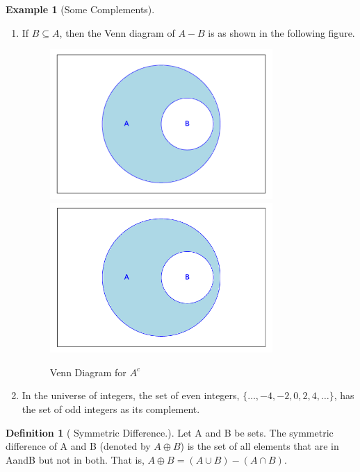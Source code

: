 \documentclass[10pt,]{book}
\theoremstyle{plain}
\theoremstyle{definition}
\newtheorem{definition}[theorem]{Definition}
\newtheorem{example}[theorem]{Example}
\begin{document}
\begin{example}[Some Complements]
\begin{enumerate}
\item\hypertarget{li-60}{} If \(B\subseteq A\), then the Venn diagram of \(A- B\) is as shown in the following figure.   
            \leavevmode%
\begin{figure}
\centering
{}%
{\includegraphics[width=0.80\textwidth]{images/sageplot-venn-complement3.pdf}}%
{\includegraphics[width=0.80\textwidth]{images/sageplot-venn-complement3.png}}
\caption{Venn Diagram for \(A^{c}\)\label{venn_diagram_complement3}}
\end{figure}
 
\item\hypertarget{li-61}{} In the universe of integers, the set of even integers, \(\{\ldots  , - 4,-2, 0, 2, 4,\ldots \}\), has the set of odd integers as its complement.
\end{enumerate}
\end{example}
\begin{definition}[ Symmetric Difference.]\label{symmetric-difference.}
Let A and B be sets. The symmetric difference of A and B (denoted by \(A\oplus B\)) is the set of all elements
that are in AandB but not in both. That is, \(A \oplus  B = (A \cup  B) - (A \cap  B)\). 
\end{definition}
\end{document}

